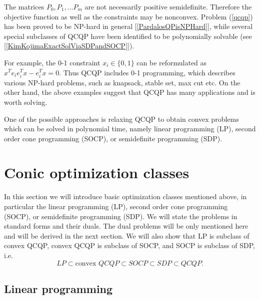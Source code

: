 \documentclass[12pt]{book}
\theoremstyle{definition}
\begin{document}
The matrices $P_0, P_1, \dots P_m$ are not necessarily positive semidefinite. Therefore the objective function as well as the constraints may be nonconvex. Problem (\ref{qcqp}) has been proved to be NP-hard in general [\ref{PardalosQPisNPHard}], while several special subclasses
of QCQP have been identified to be polynomially solvable (see [\ref{KimKojimaExactSolViaSDPandSOCP}]).

For example, the 0-1 constraint $x_i\in \{0,1\}$ can be reformulated as $x^Te_ie_i^Tx - e_i^Tx =0$. Thus QCQP includes 0-1 programming, which describes various NP-hard problems, such as knapsack, stable set, max cut etc. 
On the other hand, the above examples suggest that QCQP has many applications and is worth solving.

One of the possible approaches is relaxing QCQP to obtain convex problems which can be solved in polynomial time, namely linear programming (LP), second order cone programming  (SOCP), or semidefinite programming (SDP). 








\chapter{Conic optimization classes}
\label{ConicOptClasses}

In this section we will introduce basic optimization classes mentioned above, in particular the  linear programming (LP), second order cone programming  (SOCP), or semidefinite programming (SDP). We will state the problems in standard forms and their duals. The dual problems will be only mentioned here and will be derived in the next section. We will also show that LP is subclass of convex QCQP, convex QCQP is subclass of SOCP, and SOCP is subclass of SDP, i.e.
\begin{equation}
LP\subset \mbox{convex } QCQP \subset SOCP \subset SDP \subset QCQP .
\end{equation}












\section{Linear programming}
\end{document}
